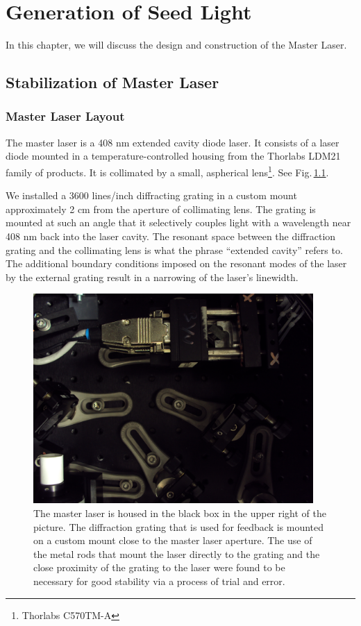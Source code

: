 \chapter{Generation of Seed Light}\label{generationOfSeedLight}

In this chapter, we will discuss the design and construction of the Master Laser. 

\section{Stabilization of Master Laser}
\subsection{Master Laser Layout}
The master laser is a 408 nm extended cavity diode laser. It consists of a laser diode mounted in a temperature-controlled housing from the Thorlabs LDM21 family of products. It is collimated by a small, aspherical lens\footnote{Thorlabs C570TM-A}. See Fig.\,\ref{master_laser_photo}.

We installed a 3600 lines/inch diffracting grating in a custom mount approximately 2 cm from the aperture of collimating lens. The grating is mounted at such an angle that it selectively couples light with a wavelength near 408 nm back into the laser cavity. The resonant space between the diffraction grating and the collimating lens is what the phrase ``extended cavity'' refers to. The additional boundary conditions imposed on the resonant modes of the laser by the external grating result in a narrowing of the laser's linewidth. 

\begin{figure}
\centerline{
\includegraphics[width=0.95\textwidth]{master_laser}}
\caption[Photograph of Master Laser]{\label{master_laser_photo} The master laser is housed in the black box in the upper right of the picture. The diffraction grating that is used for feedback is mounted on a custom mount close to the master laser aperture. The use of the metal rods that mount the laser directly to the grating and the close proximity of the grating to the laser were found to be necessary for good stability via a process of trial and error.}
\end{figure}

